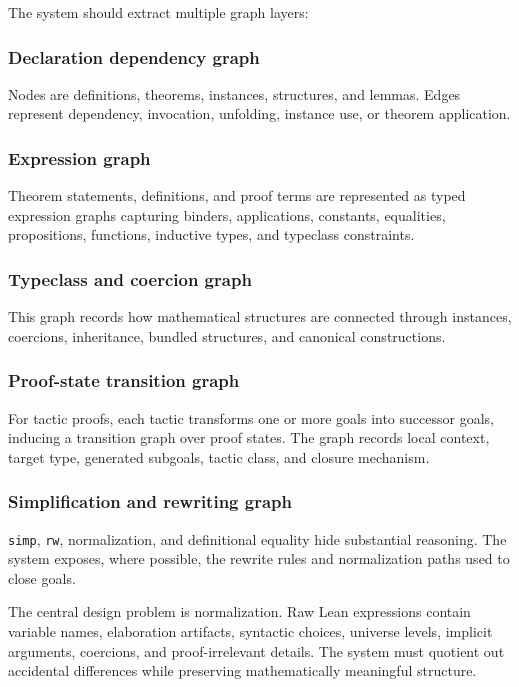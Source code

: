 \documentclass[12pt, a4paper]{article}
\begin{document}
The system should extract multiple graph layers:

\subsubsection{Declaration dependency graph}
Nodes are definitions, theorems, instances, structures, and lemmas. Edges
represent dependency, invocation, unfolding, instance use, or theorem
application.

\subsubsection{Expression graph}
Theorem statements, definitions, and proof terms are represented as typed
expression graphs capturing binders, applications, constants, equalities,
propositions, functions, inductive types, and typeclass constraints.

\subsubsection{Typeclass and coercion graph}
This graph records how mathematical structures are connected through
instances, coercions, inheritance, bundled structures, and canonical
constructions.

\subsubsection{Proof-state transition graph}
For tactic proofs, each tactic transforms one or more goals into successor
goals, inducing a transition graph over proof states. The graph records local
context, target type, generated subgoals, tactic class, and closure
mechanism.

\subsubsection{Simplification and rewriting graph}
\texttt{simp}, \texttt{rw}, normalization, and definitional equality hide
substantial reasoning. The system exposes, where possible, the rewrite rules
and normalization paths used to close goals.

The central design problem is normalization. Raw Lean expressions contain
variable names, elaboration artifacts, syntactic choices, universe levels,
implicit arguments, coercions, and proof-irrelevant details. The system must
quotient out accidental differences while preserving mathematically meaningful
structure.
\end{document}
